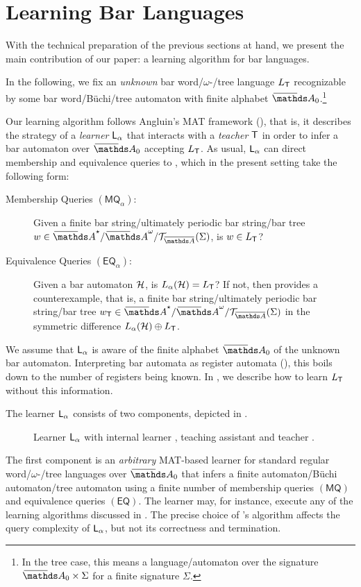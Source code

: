 \documentclass[a4paper,UKenglish,cleveref,autoref,thm-restate,numberwithinsect,final]{lipics-v2021}
\begin{document}
    \section{Learning Bar Languages}\label{sec:learningRNNA}
With the technical preparation of the previous sections at hand, we present the main contribution of our paper: a learning algorithm for bar languages.  
\begin{notation}
In the following, we fix an \emph{unknown} bar word/$\omega$-/tree language $L_\textsf{T}$ recognizable by some bar word/Büchi/tree automaton with finite alphabet $\barNames_0$.\footnote{In the tree case, this means a language/automaton over the signature $\barNames_0\times \Sigma$ for a finite signature $\Sigma$.}
\end{notation}
Our learning algorithm follows Angluin's MAT framework (), that is, it describes the strategy of a \emph{learner} $\textsf{L}_\alpha$ that interacts with a \emph{teacher} $\textsf{T}$ in order to infer a bar automaton over $\barNames_0$ accepting $L_\textsf{T}$.
As usual, $\textsf{L}_\alpha$ can direct membership and equivalence queries to \teach, which in the
present setting take the following form:
    \begin{description}
        \item[Membership Queries $(\textsf{MQ}_\alpha)$:]
            Given a finite bar string/ultimately periodic bar string/bar tree $w\in \barAs/\barAw/\bartree(\Sigma)$, is $w \in L_\textsf{T}$?
        \item[Equivalence Queries $(\textsf{EQ}_\alpha)$:]
            Given a bar automaton $\mathcal{H}$, is $L_\alpha(\mathcal{H})=L_\textsf{T}$? If not,
            then \teach provides a counterexample, that is, a finite bar string/ultimately periodic
            bar string/bar tree $w_\teach\in \barAs/\barAw/\bartree(\Sigma)$ in the symmetric difference $L_\alpha(\mathcal{H})\oplus L_\textsf{T}$.
    \end{description}
 We assume that $\textsf{L}_\alpha$ is aware of the finite alphabet $\barNames_0$ of the unknown bar automaton. Interpreting bar automata as register automata (), this boils down to the number of registers being known. In , we describe how to learn $L_\textsf{T}$ without this information. 

The learner $\textsf{L}_\alpha$ consists of two components, depicted in . 
    \begin{figure*}[t]
        \centering
        
        \caption{\label{fig:talearner}Learner $\textsf{L}_\alpha$ with internal learner \learn, teaching assistant \tass and  teacher \teach.}
    \end{figure*}
The first component is an \emph{arbitrary} MAT-based learner \learn for standard regular word/$\omega$-/tree languages over $\barNames_0$ that infers a finite automaton/Büchi automaton/tree automaton using a finite number of membership queries $(\textsf{MQ})$ and equivalence queries $(\textsf{EQ})$.  The learner \learn may, for instance, execute any of the learning algorithms discussed in . The precise choice of \learn's algorithm affects the query complexity of $\textsf{L}_\alpha$, but not its correctness and termination.
\end{document}
